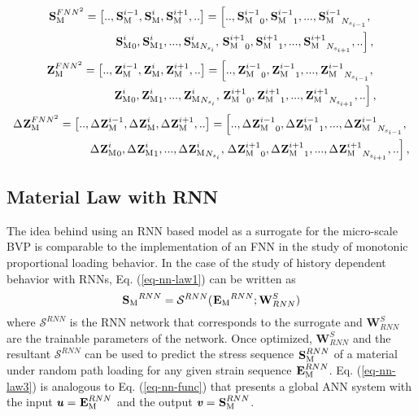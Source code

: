 \begin{eqnarray}\label{eq-nn-data13}
\tgm[]{S}^{FNN^2}=\left[..,\tgm[]{S}^{i-1},\tgm[]{S}^i,\tgm[]{S}^{i+1},..\right] = 
\left[..,{\tgm[]{S}^{i-1}}_0,{\tgm[]{S}^{i-1}}_1,...,{\tgm[]{S}^{i-1}}_{N_{s_{i-1}}},\right.\nonumber\\
{\tgm[]{S}^i}_0,{\tgm[]{S}^i}_1,...,{\tgm[]{S}^i}_{N_{s_i}},
\left.{\tgm[]{S}^{i+1}}_0,{\tgm[]{S}^{i+1}}_1,...,{\tgm[]{S}^{i+1}}_{N_{s_{i+1}}},..\right],
\end{eqnarray}
\begin{eqnarray}\label{eq-nn-data14}
\tgm[]{Z}^{FNN^2}=\left[..,\tgm[]{Z}^{i-1},\tgm[]{Z}^i,\tgm[]{Z}^{i+1},..\right] = 
\left[..,{\tgm[]{Z}^{i-1}}_0,{\tgm[]{Z}^{i-1}}_1,...,{\tgm[]{Z}^{i-1}}_{N_{s_{i-1}}},\right.\nonumber\\
{\tgm[]{Z}^i}_0,{\tgm[]{Z}^i}_1,...,{\tgm[]{Z}^i}_{N_{s_i}},
\left.{\tgm[]{Z}^{i+1}}_0,{\tgm[]{Z}^{i+1}}_1,...,{\tgm[]{Z}^{i+1}}_{N_{s_{i+1}}},..\right],
\end{eqnarray}
\begin{eqnarray}\label{eq-nn-data15}
\Delta\tgm[]{Z}^{FNN^2}=\left[..,\Delta\tgm[]{Z}^{i-1},\Delta\tgm[]{Z}^i,\Delta\tgm[]{Z}^{i+1},..\right] = 
\left[..,{\Delta\tgm[]{Z}^{i-1}}_0,{\Delta\tgm[]{Z}^{i-1}}_1,...,{\Delta\tgm[]{Z}^{i-1}}_{N_{s_{i-1}}},\right.\nonumber\\
{\Delta\tgm[]{Z}^i}_0,{\Delta\tgm[]{Z}^i}_1,...,{\Delta\tgm[]{Z}^i}_{N_{s_i}},
\left.{\Delta\tgm[]{Z}^{i+1}}_0,{\Delta\tgm[]{Z}^{i+1}}_1,...,{\Delta\tgm[]{Z}^{i+1}}_{N_{s_{i+1}}},..\right],
\end{eqnarray}

\subsection{Material Law with RNN}\label{nn-dnn-material}
The idea behind using an RNN based model as a surrogate for the micro-scale BVP is comparable to the implementation of an FNN in the study of monotonic proportional loading behavior. In the case of the study of history dependent behavior with RNNs, Eq. (\ref{eq-nn-law1}) can be written as
\begin{equation}\label{eq-nn-law3}
{\tgm[]{S}}^{RNN} = \mathcal{S}^{RNN}({\tgm[]{E}}^{RNN};\textbf{W}^S_{RNN})
\end{equation}
where $ \mathcal{S}^{RNN} $ is the RNN network that corresponds to the surrogate and $ \textbf{W}^S_{RNN} $ are the trainable parameters of the network. Once optimized, $ \textbf{W}^S_{RNN} $ and the resultant $ \mathcal{S}^{RNN} $ can be used to predict the stress sequence $ \tgm{S}^{RNN} $ of a material under random path loading for any given strain sequence $ \tgm{E}^{RNN} $. Eq. (\ref{eq-nn-law3}) is analogous to Eq. (\ref{eq-nn-func}) that presents a global ANN system with the input $ \textbf{\textit{u}}=\tgm[]{E}^{RNN} $ and the output $ \textbf{\textit{v}}=\tgm[]{S}^{RNN} $.

